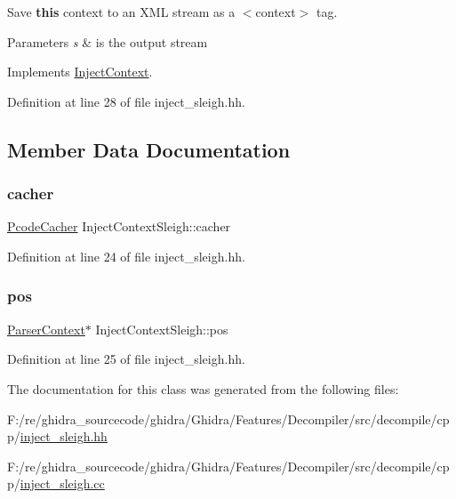 Save {\bfseries{this}} context to an X\+ML stream as a $<$context$>$ tag. 


\begin{DoxyParams}{Parameters}
{\em s} & is the output stream \\
\hline
\end{DoxyParams}


Implements \mbox{\hyperlink{class_inject_context_a85884d6d9e18996f0b03aa10a4e11be6}{Inject\+Context}}.



Definition at line 28 of file inject\+\_\+sleigh.\+hh.



\subsection{Member Data Documentation}
\mbox{\label{class_inject_context_sleigh_a83bd13e4152f969e2db32052bb960268}} 
\subsubsection{\texorpdfstring{cacher}{cacher}}
{\footnotesize\ttfamily \mbox{\hyperlink{class_pcode_cacher}{Pcode\+Cacher}} Inject\+Context\+Sleigh\+::cacher}



Definition at line 24 of file inject\+\_\+sleigh.\+hh.

\mbox{\label{class_inject_context_sleigh_a4f304984d73d8e7b00b976af7e80bd75}} 
\subsubsection{\texorpdfstring{pos}{pos}}
{\footnotesize\ttfamily \mbox{\hyperlink{class_parser_context}{Parser\+Context}}$\ast$ Inject\+Context\+Sleigh\+::pos}



Definition at line 25 of file inject\+\_\+sleigh.\+hh.



The documentation for this class was generated from the following files\+:\begin{DoxyCompactItemize}
\item 
F\+:/re/ghidra\+\_\+sourcecode/ghidra/\+Ghidra/\+Features/\+Decompiler/src/decompile/cpp/\mbox{\hyperlink{inject__sleigh_8hh}{inject\+\_\+sleigh.\+hh}}\item 
F\+:/re/ghidra\+\_\+sourcecode/ghidra/\+Ghidra/\+Features/\+Decompiler/src/decompile/cpp/\mbox{\hyperlink{inject__sleigh_8cc}{inject\+\_\+sleigh.\+cc}}\end{DoxyCompactItemize}
